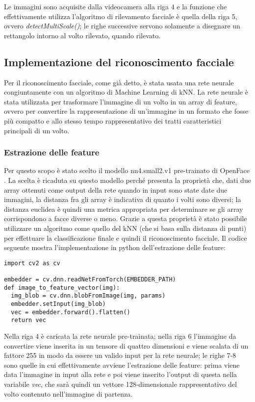 Le immagini sono acquisite dalla videocamera alla riga 4 e la funzione che effettivamente utilizza l'algoritmo di rilevamento facciale è quella della riga 5, ovvero \textit{detectMultiScale()}; le righe successive servono solamente a disegnare un rettangolo intorno al volto rilevato, quando rilevato. 

\subsection{Implementazione del riconoscimento facciale}
Per il riconoscimento facciale, come già detto, è stata usata una rete neurale congiuntamente con un algoritmo di Machine Learning di kNN. La rete neurale è stata utilizzata per trasformare l'immagine di un volto in un array di feature, ovvero per convertire la rappresentazione di un'immagine in un formato che fosse più compatto e allo stesso tempo rappresentativo dei tratti caratteristici principali di un volto. 

\subsubsection{Estrazione delle feature}
Per questo scopo è stato scelto il modello nn4.small2.v1 pre-trainato di OpenFace \cite{amos2016openface}. La scelta è ricaduta su questo modello perché presenta la proprietà che, dati due array ottenuti come output della rete quando in input sono state date due immagini, la distanza fra gli array è indicativa di quanto i volti sono diversi; la distanza euclidea è quindi una metrica appropriata per determinare se gli array corrispondono a facce diverse o meno. Grazie a questa proprietà è stato possibile utilizzare un algoritmo come quello del kNN (che si basa sulla distanza di punti) per effettuare la classificazione finale e quindi il riconoscimento facciale. Il codice seguente mostra l'implementazione in python dell'estrazione delle feature:

\begin{lstlisting}
import cv2 as cv 

embedder = cv.dnn.readNetFromTorch(EMBEDDER_PATH)
def image_to_feature_vector(img):
  img_blob = cv.dnn.blobFromImage(img, params)
  embedder.setInput(img_blob)
  vec = embedder.forward().flatten()
  return vec
\end{lstlisting}


Nella riga 4 è caricata la rete neurale pre-trainata; nella riga 6 l'immagine da convertire viene inserita in un tensore di quattro dimensioni e viene scalata di un fattore 255 in modo da essere un valido input per la rete neurale; le righe 7-8 sono quelle in cui effettivamente avviene l'estrazione delle feature: prima viene data l'immagine in input alla rete e poi viene inserito l'output di questa nella variabile \textit{vec}, che sarà quindi un vettore 128-dimensionale rappresentativo del volto contenuto nell'immagine di partenza.


